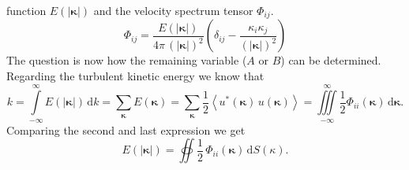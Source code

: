 \documentclass[preprint,12pt,ntfdMod]{elsarticle}
\begin{document}
\begin{par}
function $E(|\boldsymbol\kappa|)$ and the velocity spectrum tensor $\Phi_{ij}$.
  \begin{equation}
  	\Phi_{ij}=\frac{E(|\boldsymbol\kappa|)}{4\pi\,(|\boldsymbol\kappa|)^2}\left(\delta_{ij}
  	-\frac{\kappa_i\kappa_j}{(|\boldsymbol\kappa|)^2}\right)
  \end{equation}
The question is now how the remaining variable ($A$ or $B$) can be determined. Regarding the turbulent kinetic
energy we know that
  \begin{equation}
      \label{eq:exp_for_k}
      k=\int\limits_{-\infty}^{\infty}E(|\boldsymbol\kappa|)\,\mathrm{d}k
      =\sum\limits_{\boldsymbol\kappa}E(\boldsymbol\kappa)
      =\sum\limits_{\boldsymbol\kappa}\frac{1}{2}\left<u^{*}(\boldsymbol\kappa)\,u(\boldsymbol\kappa)\right>
      =\iiint\limits_{-\infty}^{\infty}\frac{1}{2}\Phi_{ii}(\boldsymbol\kappa)\,\mathrm{d}\boldsymbol\kappa.
  \end{equation}
Comparing the second and last expression we get
  \begin{equation}
      E(|\boldsymbol\kappa|)=\oiint\frac{1}{2}\,\Phi_{ii}(\boldsymbol\kappa)\,\mathrm{d}S(\kappa).
  \end{equation}
  \begin{figure}[t!]
      \centering
\end{figure}
\end{par}
\end{document}

